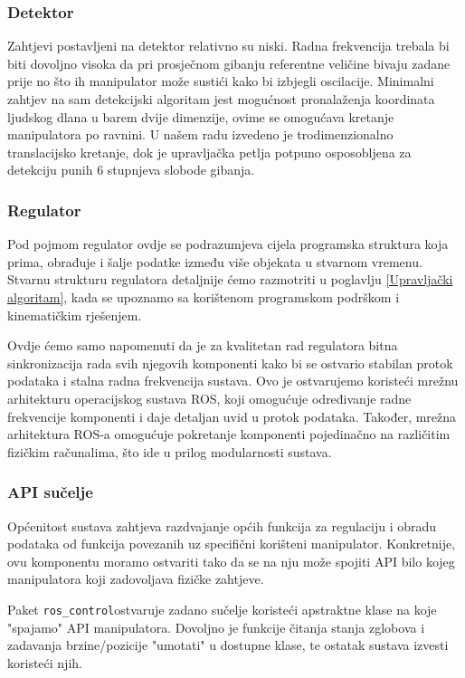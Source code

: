 \documentclass[times, utf8, diplomski, numeric]{fer}
\begin{document}
\subsubsection{Detektor}
Zahtjevi postavljeni na detektor relativno su niski. 
Radna frekvencija trebala bi biti dovoljno visoka da pri prosječnom gibanju referentne veličine bivaju zadane prije no što ih manipulator može sustići kako bi izbjegli oscilacije.
Minimalni zahtjev na sam detekcijski algoritam jest mogućnost pronalaženja koordinata ljudskog dlana u barem dvije dimenzije, ovime se omogućava kretanje manipulatora po ravnini.
U našem radu izvedeno je trodimenzionalno translacijsko kretanje, dok je upravljačka petlja potpuno osposobljena za detekciju punih 6 stupnjeva slobode gibanja.

\subsubsection{Regulator}
Pod pojmom regulator ovdje se podrazumjeva cijela programska struktura koja prima, obrađuje i šalje podatke između više objekata u stvarnom vremenu.
Stvarnu strukturu regulatora detaljnije ćemo razmotriti u poglavlju \ref{Upravljački algoritam}, kada se upoznamo sa korištenom programskom podrškom i kinematičkim rješenjem.

Ovdje ćemo samo napomenuti da je za kvalitetan rad regulatora bitna sinkronizacija rada svih njegovih komponenti kako bi se ostvario stabilan protok podataka i stalna radna frekvencija sustava.
Ovo je ostvarujemo koristeći mrežnu arhitekturu operacijskog sustava ROS, koji omogućuje određivanje radne frekvencije komponenti i daje detaljan uvid u protok podataka.
Također, mrežna arhitektura ROS-a omogućuje pokretanje komponenti pojedinačno na različitim fizičkim računalima, što ide u prilog modularnosti sustava.

\subsubsection{API sučelje}
Općenitost sustava zahtjeva razdvajanje općih funkcija za regulaciju i obradu podataka od funkcija povezanih uz specifični korišteni manipulator.
Konkretnije, ovu komponentu moramo ostvariti tako da se na nju može spojiti API bilo kojeg manipulatora koji zadovoljava fizičke zahtjeve.

Paket \texttt{ros\_control}ostvaruje zadano sučelje koristeći apstraktne klase na koje "spajamo" API manipulatora.
Dovoljno je funkcije čitanja stanja zglobova i zadavanja brzine/pozicije "umotati" u dostupne klase, te ostatak sustava izvesti koristeći njih.
\end{document}
